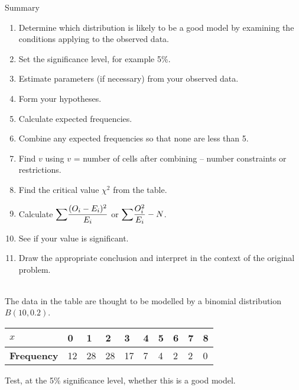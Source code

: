 \documentclass[fleqn]{article}
\begin{document}
\begin{mybox2}[colbacktitle=WildStrawberry]{Summary}
    \begin{enumerate}[leftmargin=5.5mm, rightmargin=4mm]
        \item Determine which distribution is likely to be a good model by examining the conditions applying to the observed data.
        \item Set the significance level, for example 5\%.
        \item Estimate parameters (if necessary) from your observed data.
        \item Form your hypotheses.
        \item Calculate expected frequencies.
        \item Combine any expected frequencies so that none are less than 5.
        \item Find $v$ using $v$ = number of cells after combining -- number constraints or restrictions.
        \item Find the critical value $\chi^2$ from the table.
        \item Calculate ${\mathlarger\sum}\dfrac{(O_i-E_i)^2}{E_i}$ or ${\mathlarger\sum}\dfrac{O_i^2}{E_i}-N$.
        \item See if your value is significant.
        \item Draw the appropriate conclusion and interpret in the context of the original problem.
    \end{enumerate}    
\end{mybox2}
\begin{examplebox}{}{}
    \\ %
    The data in the table are thought to be modelled by a binomial distribution $B(10,0.2)$.
    
    \begin{center}
        \begin{minipage}[t]{0.75\linewidth}
            \begin{tabularx}{\textwidth}{|X|*9{P{8mm}|}}
                \hline
                $x$                & 0  & 1  & 2  & 3  & 4 & 5 & 6 & 7 & 8    \\\hline
                \textbf{Frequency} & 12 & 28 & 28 & 17 & 7 & 4 & 2 & 2 & 0    \\\hline
            \end{tabularx}
            \vspace{4mm}
        \end{minipage}
    \end{center}
    
    Test, at the 5\% significance level, whether this is a good model.
\end{examplebox}
\newpage
\end{document}

